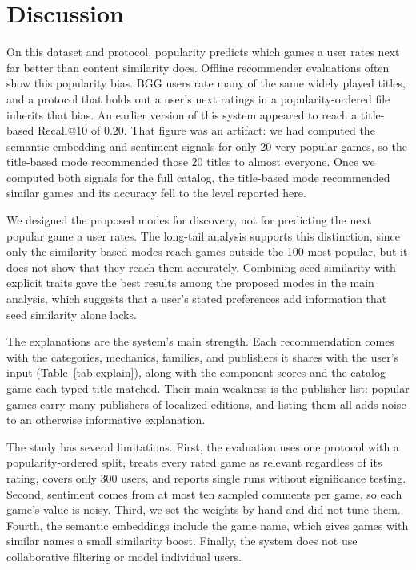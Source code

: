 \documentclass[conference]{IEEEtran}
\begin{document}
\section{Discussion}

On this dataset and protocol, popularity predicts which games a user rates next far better than content similarity does. Offline recommender evaluations often show this popularity bias. BGG users rate many of the same widely played titles, and a protocol that holds out a user's next ratings in a popularity-ordered file inherits that bias. An earlier version of this system appeared to reach a title-based Recall@10 of 0.20. That figure was an artifact: we had computed the semantic-embedding and sentiment signals for only 20 very popular games, so the title-based mode recommended those 20 titles to almost everyone. Once we computed both signals for the full catalog, the title-based mode recommended similar games and its accuracy fell to the level reported here.

We designed the proposed modes for discovery, not for predicting the next popular game a user rates. The long-tail analysis supports this distinction, since only the similarity-based modes reach games outside the 100 most popular, but it does not show that they reach them accurately. Combining seed similarity with explicit traits gave the best results among the proposed modes in the main analysis, which suggests that a user's stated preferences add information that seed similarity alone lacks.

The explanations are the system's main strength. Each recommendation comes with the categories, mechanics, families, and publishers it shares with the user's input (Table~\ref{tab:explain}), along with the component scores and the catalog game each typed title matched. Their main weakness is the publisher list: popular games carry many publishers of localized editions, and listing them all adds noise to an otherwise informative explanation.

The study has several limitations. First, the evaluation uses one protocol with a popularity-ordered split, treats every rated game as relevant regardless of its rating, covers only 300 users, and reports single runs without significance testing. Second, sentiment comes from at most ten sampled comments per game, so each game's value is noisy. Third, we set the weights by hand and did not tune them. Fourth, the semantic embeddings include the game name, which gives games with similar names a small similarity boost. Finally, the system does not use collaborative filtering or model individual users.
\end{document}
